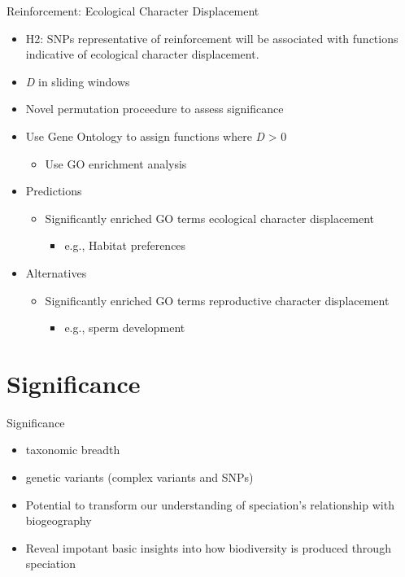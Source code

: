 \documentclass[t,10pt]{beamer}
\begin{document}
\begin{frame}[label={sec:orgheadline39}]{Reinforcement: Ecological Character Displacement}
\begin{itemize}[<+->]
\item H2: SNPs representative of \alert{reinforcement} will be associated with functions indicative of ecological character displacement. \vspace{0.25in}
\item \emph{D} in sliding windows
\item Novel permutation proceedure to assess significance
\item Use Gene Ontology to assign functions where \emph{D} > 0
\begin{itemize}
\item Use GO enrichment analysis
\end{itemize}
\item Predictions
\begin{itemize}
\item Significantly enriched GO terms ecological character displacement
\begin{itemize}
\item e.g., Habitat preferences
\end{itemize}
\end{itemize}
\item Alternatives
\begin{itemize}
\item Significantly enriched GO terms reproductive character displacement
\begin{itemize}
\item e.g., sperm development
\end{itemize}
\end{itemize}
\end{itemize}
\end{frame}
\section{Significance}
\label{sec:orgheadline42}
\begin{frame}[label={sec:orgheadline41}]{Significance}
\begin{itemize}[<+->]
\item taxonomic breadth \vspace{0.25in}
\item genetic variants (complex variants and SNPs) \vspace{0.25in}
\item Potential to transform our understanding of speciation's relationship with biogeography \vspace{0.25in}
\item Reveal impotant basic insights into how biodiversity is produced through speciation \vspace{0.25in}
\end{itemize}
\end{frame}
\end{document}
